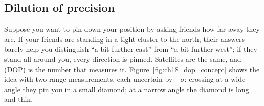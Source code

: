 \subsection{Dilution of precision}

Suppose you want to pin down your position by asking friends how far away they are. If your
friends are standing in a tight cluster to the north, their answers barely help you distinguish
``a bit further east'' from ``a bit further west''; if they stand all around you, every direction
is pinned. Satellites are the same, and  (DOP) is the number that
measures it. Figure~\ref{fig:ch18_dop_concept} shows the idea with two range measurements, each
uncertain by $\pm\sigma$: crossing at a wide angle they pin you in a small diamond; at a narrow
angle the diamond is long and thin.


